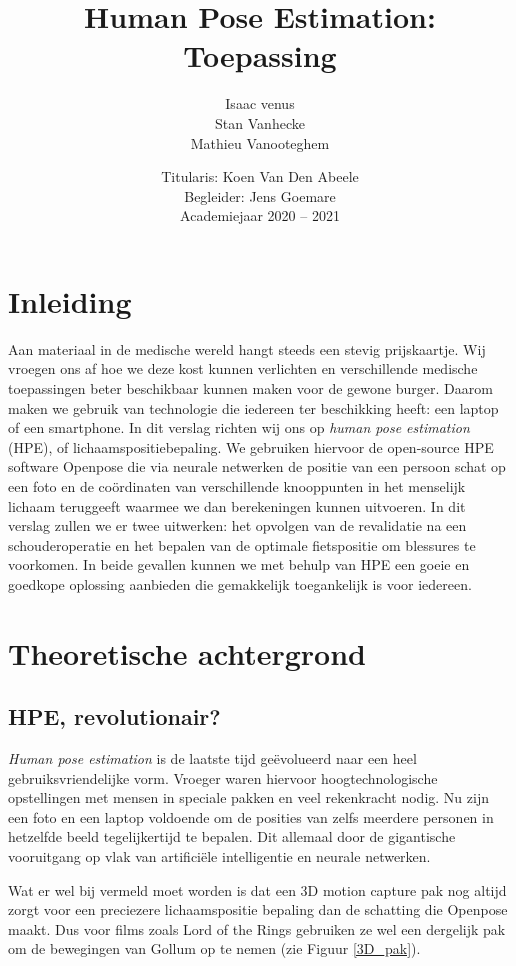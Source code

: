 \documentclass[a4paper,twoside,kulak]{kulakreport}
\title{Human Pose Estimation:\\Toepassing}
\subtitle{}
\author{Isaac venus\\Stan Vanhecke\\Mathieu Vanooteghem}
\institute{KU Leuven Kulak, Wetenschap \& Technologie}
\date{Titularis: Koen Van Den Abeele\\Begleider: Jens Goemare\\Academiejaar 2020 -- 2021}
\begin{document}

\titlepage

\tableofcontents

\chapter*{Inleiding}
Aan materiaal in de medische wereld hangt steeds een stevig prijskaartje. Wij vroegen ons af hoe we deze kost kunnen verlichten en verschillende medische toepassingen beter beschikbaar kunnen maken voor de gewone burger. Daarom maken we gebruik van technologie die iedereen ter beschikking heeft: een laptop of een smartphone.
In dit verslag richten wij ons op \emph{human pose estimation} (HPE), of lichaamspositiebepaling. We gebruiken hiervoor de open-source HPE software Openpose die via neurale netwerken de positie van een persoon schat op een foto en de coördinaten van verschillende knooppunten in het menselijk lichaam teruggeeft waarmee we dan berekeningen kunnen uitvoeren. In dit verslag zullen we er twee uitwerken: het opvolgen van de revalidatie na een schouderoperatie en het bepalen van de optimale fietspositie om blessures te voorkomen. In beide gevallen kunnen we met behulp van HPE een goeie en goedkope oplossing aanbieden die gemakkelijk toegankelijk is voor iedereen.

\chapter{Theoretische achtergrond}
\section{HPE, revolutionair?}
\emph{Human pose estimation} is de laatste tijd geëvolueerd naar een heel gebruiksvriendelijke vorm. Vroeger waren hiervoor hoogtechnologische opstellingen met mensen in speciale pakken en veel rekenkracht nodig. Nu zijn een foto en een laptop voldoende om de posities van zelfs meerdere personen in hetzelfde beeld tegelijkertijd te bepalen. Dit allemaal door de gigantische vooruitgang op vlak van artificiële intelligentie en neurale netwerken.

Wat er wel bij vermeld moet worden is dat een 3D motion capture pak nog altijd zorgt voor een preciezere lichaamspositie bepaling dan de schatting die Openpose maakt. Dus voor films zoals Lord of the Rings gebruiken ze wel een dergelijk pak om de bewegingen van Gollum op te nemen (zie Figuur \ref{3D_pak}).
\end{document}
